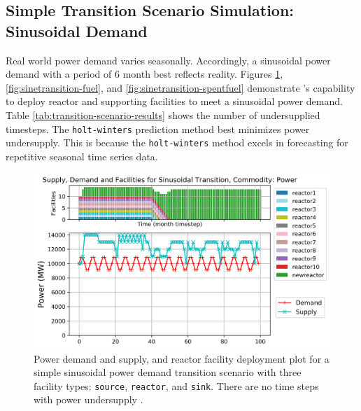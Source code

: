     \subsection{Simple Transition Scenario Simulation: Sinusoidal Demand}
    Real world power demand varies seasonally. 
    Accordingly, a sinusoidal power demand with a period of 6 month best 
    reflects reality. 
    Figures \ref{fig:sinetransition-power}, \ref{fig:sinetransition-fuel},
    and \ref{fig:sinetransition-spentfuel} demonstrate \deploy's capability 
    to deploy reactor and supporting facilities to meet a sinusoidal power
    demand. 
    Table \ref{tab:transition-scenario-results} shows the number of 
    undersupplied timesteps.
    The \texttt{holt-winters} prediction method best minimizes power 
    undersupply.  
    This is because the \texttt{holt-winters} method excels in
    forecasting for repetitive seasonal time series data. 

    \begin{figure}[]
        \centering
        \includegraphics[width=0.9\linewidth]{figures/sinetransition-power.png} 
            \caption{Power demand and supply, and reactor facility deployment plot for  
            a simple sinusoidal power demand transition scenario with 
            three facility types: \texttt{source}, \texttt{reactor}, and \texttt{sink}.
            There are no time steps with power undersupply \cite{chee_arfc/transition-scenarios_2018}.}
            \label{fig:sinetransition-power}
    \end{figure}
    
